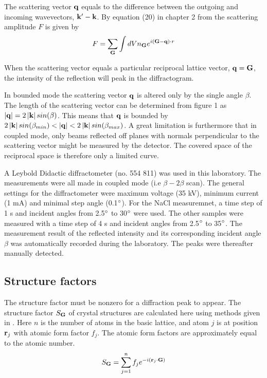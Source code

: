 \documentclass[a4paper,twoside=false,abstract=false,numbers=noenddot,
titlepage=false,headings=small,parskip=half,version=last]{scrartcl}
\begin{document}
The scattering vector $\bold{q}$ equals to the difference between the outgoing and incoming wavevectors,
$\bold{k}' - \bold{k}$. By equation (20) in chapter 2 from \cite{Kittel} the scattering
amplitude $F$ is given by
\begin{equation}
    \label{eq:scatamp}
    F = \sum_\bold{G} \int dV n_{\bold{G}} e^{i(\bold{G}-\bold{q})\cdot r}
\end{equation}

When the scattering vector equals a particular reciprocal lattice vector, $\bold{q} = \bold{G}$, the intensity of the reflection will peak in the diffractogram. 


In bounded mode the scattering vector $\bold{q}$ is altered only by the single angle $\beta$.
The length of the scattering vector can be determined from figure 1 as $\left\vert \bold{q} \right\vert = 2 \left\vert \bold{k} \right\vert sin(\beta)$.
This means that $\bold{q}$ is bounded by $2 \left\vert \bold{k} \right\vert sin(\beta_{min}) < \left\vert \bold{q} \right\vert < 2 \left\vert \bold{k} \right\vert sin(\beta_{max})$.
A great limitation is furthermore that in coupled mode, only beams reflected off planes with normals perpendicular to the scattering vector might be measured by the detector. The covered space of the reciprocal space is therefore only a limited curve.


A Leybold Didactic diffractometer (no. 554 811) was used in this laboratory. The measurements were all made in coupled mode (i.e $\beta-2\beta$ scan). The general settings for the diffractometer were maximum voltage (35 kV), minimum current (1 mA) and minimal step angle (0.1$\degree$). For the NaCl measuremnet, a time step of 1 s and incident angles from 2.5$\degree$ to 30$\degree$ were used. The other samples were measured with a time step of 4 s and incident angles from 2.5$\degree$ to 35$\degree$. The measurement result of the reflected intensity and its corresponding incident angle $\beta$ was automatically recorded during the laboratory. The peaks were thereafter manually detected.

\subsection{Structure factors}
The structure factor must be nonzero for a diffraction peak to appear.
The structure factor $S_{\bold{G}}$ of crystal structures are calculated here using methods given in \cite{Kittel}. Here $n$ is the number of atoms in the basic lattice, and atom $j$ is at position $\bold{r}_j$ with atomic form factor $f_j$. The atomic form factors are approximately equal to the atomic number.\\
\begin{equation}
    S_{\bold{G}} = \sum^n_{j=1} f_j e^{-i \left( \bold{r}_j \cdot \bold{G}\right)}\nonumber
\end{equation}
\end{document}

